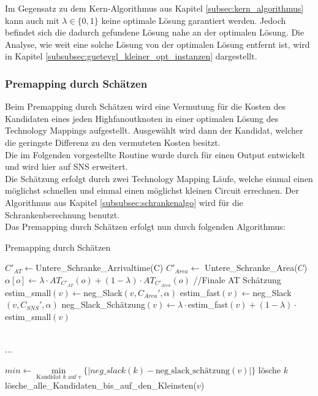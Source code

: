 \documentclass[11pt, a4paper, german]{article}
\newcommand{\TM}{Technology  Mapping }
\begin{document}
Im Gegensatz zu dem Kern-Algorithmus aus Kapitel \ref{subsec:kern_algorithmus} kann auch mit $\lambda \in \{ 0 , 1\}$ keine optimale Lösung garantiert werden. Jedoch befindet sich die dadurch gefundene Lösung nahe an der optimalen Lösung. Die Analyse, wie weit eine solche Lösung von der optimalen Lösung entfernt ist, wird in Kapitel \ref{subsubsec:guetevgl_kleiner_opt_instanzen} dargestellt.
 
\subsubsection{Premapping durch Schätzen}
\label{subsec:premapping_duch_schaetzen}
Beim Premapping durch Schätzen wird eine Vermutung für die Kosten des Kandidaten eines jeden Highfanoutknoten in einer optimalen Lösung des Technology Mappings aufgestellt. Ausgewählt wird dann der Kandidat, welcher die geringste Differenz zu den vermuteten Kosten besitzt.\\
Die im Folgenden vorgestellte Routine wurde durch \cite{Elbert} für einen Output entwickelt und wird hier auf SNS erweitert.\\
Die Schätzung erfolgt durch zwei \TM Läufe, welche einmal einen möglichst schnellen und einmal einen möglichst kleinen Circuit errechnen. Der Algorithmus aus Kapitel \ref{subsubsec:schrankenalgo} wird für die Schrankenberechnung benutzt.\\

 Das Premapping durch Schätzen erfolgt nun durch folgenden Algorithmus:\\
 
\begin{algorithm}[H]
 \LinesNumbered
 \DontPrintSemicolon
 \caption{Premapping durch Schätzen}
 $C'_{AT} \gets $Untere\_Schranke\_Arrivaltime(C)\;
$C'_{Area} \gets$ Untere\_Schranke\_Area($C$)\; 
{
	$\alpha[o] \gets \lambda \cdot AT_{C'_{AT}}(o) + (1-\lambda)\cdot AT_{C'_{Area}}(o)$ //Finale AT Sch\"atzung \;
}
 {
  estim\_small$(v) \gets $neg\_Slack$(v,C_{Area}',\alpha)$\;
  estim\_fast$(v) \gets $neg\_Slack$(v,C_{SNS}',\alpha)$\;
  neg\_Slack\_Sch\"atzung$(v) \gets \lambda \cdot $estim\_fast$(v) + (1-\lambda)\cdot$estim\_small$(v)$\;
 }
 
\ \\...\\ \;
 
  {
    $min \gets \min\limits_{\text{Kandidat }k\text{ auf }v}\{|neg\_slack(k)-\text{neg\_slack\_sch\"atzung}(v)|\}$\;
    {
      {
	l\"osche $k$\;
      }
    }
    {
      lösche\_alle\_Kandidaten\_bis\_auf\_den\_Kleinsten($v$)\;
      }
   }
\end{algorithm}\ \\
 
\end{document}
